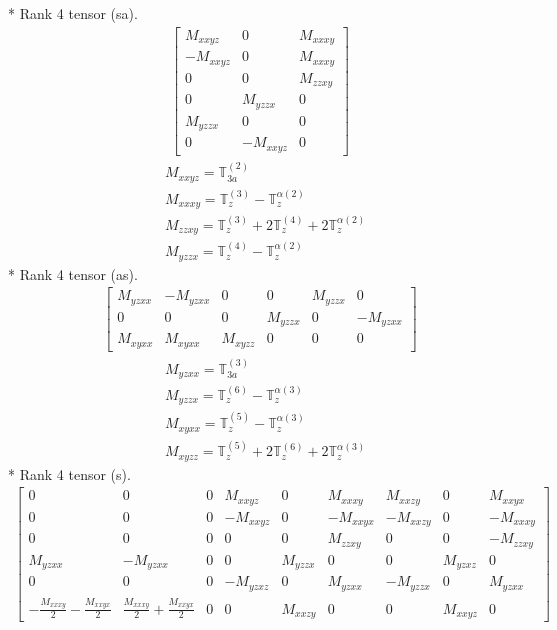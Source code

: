 \documentclass[fleqn,8pt,landscape]{jsarticle}
\begin{document}
* Rank 4 tensor (sa).
\begin{align*}
\begin{bmatrix} M_{xxyz} & 0 & M_{xxxy} \\ - M_{xxyz} & 0 & M_{xxxy} \\ 0 & 0 & M_{zzxy} \\ 0 & M_{yzzx} & 0 \\ M_{yzzx} & 0 & 0 \\ 0 & - M_{xxyz} & 0 \end{bmatrix}
\end{align*}
\begin{align*}
& M_{xxyz} = \mathbb{T}_{3a}^{(2)} \\
& M_{xxxy} = \mathbb{T}_{z}^{(3)} - \mathbb{T}_{z}^{\alpha(2)} \\
& M_{zzxy} = \mathbb{T}_{z}^{(3)} + 2 \mathbb{T}_{z}^{(4)} + 2 \mathbb{T}_{z}^{\alpha(2)} \\
& M_{yzzx} = \mathbb{T}_{z}^{(4)} - \mathbb{T}_{z}^{\alpha(2)}
\end{align*}
* Rank 4 tensor (as).
\begin{align*}
\begin{bmatrix} M_{yzxx} & - M_{yzxx} & 0 & 0 & M_{yzzx} & 0 \\ 0 & 0 & 0 & M_{yzzx} & 0 & - M_{yzxx} \\ M_{xyxx} & M_{xyxx} & M_{xyzz} & 0 & 0 & 0 \end{bmatrix}
\end{align*}
\begin{align*}
& M_{yzxx} = \mathbb{T}_{3a}^{(3)} \\
& M_{yzzx} = \mathbb{T}_{z}^{(6)} - \mathbb{T}_{z}^{\alpha(3)} \\
& M_{xyxx} = \mathbb{T}_{z}^{(5)} - \mathbb{T}_{z}^{\alpha(3)} \\
& M_{xyzz} = \mathbb{T}_{z}^{(5)} + 2 \mathbb{T}_{z}^{(6)} + 2 \mathbb{T}_{z}^{\alpha(3)}
\end{align*}
* Rank 4 tensor (s).
\begin{align*}
\begin{bmatrix} 0 & 0 & 0 & M_{xxyz} & 0 & M_{xxxy} & M_{xxzy} & 0 & M_{xxyx} \\ 0 & 0 & 0 & - M_{xxyz} & 0 & - M_{xxyx} & - M_{xxzy} & 0 & - M_{xxxy} \\ 0 & 0 & 0 & 0 & 0 & M_{zzxy} & 0 & 0 & - M_{zzxy} \\ M_{yzxx} & - M_{yzxx} & 0 & 0 & M_{yzzx} & 0 & 0 & M_{yzxz} & 0 \\ 0 & 0 & 0 & - M_{yzxz} & 0 & M_{yzxx} & - M_{yzzx} & 0 & M_{yzxx} \\ - \frac{M_{xxxy}}{2} - \frac{M_{xxyx}}{2} & \frac{M_{xxxy}}{2} + \frac{M_{xxyx}}{2} & 0 & 0 & M_{xxzy} & 0 & 0 & M_{xxyz} & 0 \end{bmatrix}
\end{align*}
\end{document}
